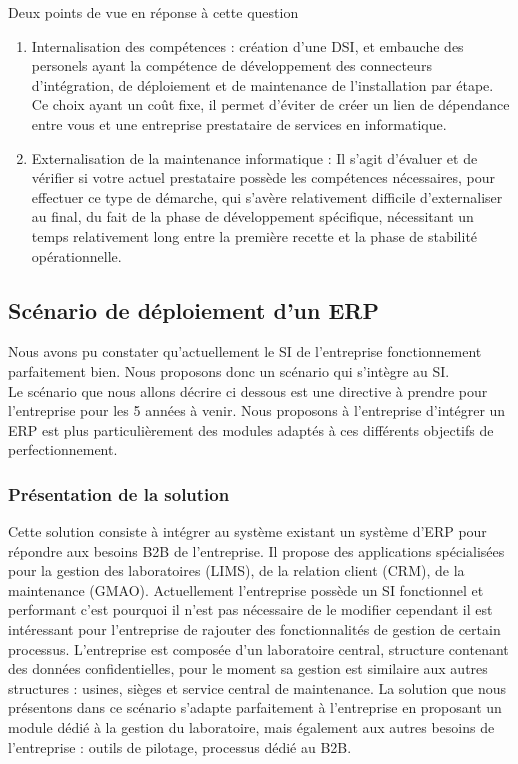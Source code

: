 Deux points de vue en réponse à cette question\\
\begin{enumerate}
\item Internalisation des compétences : création d'une DSI, et embauche des personels ayant la compétence de développement des connecteurs d'intégration, de déploiement et de maintenance de l'installation par étape. Ce choix ayant un coût fixe, il permet d'éviter de créer un lien de dépendance entre vous et une entreprise prestataire de services en informatique.
\item Externalisation de la maintenance informatique : Il s'agit d'évaluer et de vérifier si votre actuel prestataire possède les compétences nécessaires, pour effectuer ce type de démarche, qui s'avère relativement difficile d'externaliser au final, du fait de la phase de développement spécifique, nécessitant un temps relativement long entre la première recette et la phase de stabilité opérationnelle.
\end{enumerate}

\subsection{Scénario de déploiement d'un ERP}
Nous avons pu constater qu'actuellement le SI de l'entreprise fonctionnement parfaitement bien. Nous proposons donc un scénario qui s'intègre au SI. \\
Le scénario que nous allons décrire ci dessous est une directive à prendre pour l'entreprise pour les 5 années à venir. Nous proposons à l'entreprise d'intégrer un ERP est plus particulièrement des modules adaptés à ces différents objectifs de perfectionnement.  
\subsubsection{Présentation de la solution}
Cette solution consiste à intégrer au système existant un système d'ERP pour répondre aux besoins B2B de l'entreprise. Il propose des applications spécialisées pour la gestion des laboratoires (LIMS), de la relation client (CRM), de la maintenance (GMAO). Actuellement l'entreprise possède un SI fonctionnel et performant c'est pourquoi il n'est pas nécessaire de le modifier cependant il est intéressant pour l'entreprise de rajouter des fonctionnalités de gestion de certain processus. L'entreprise est composée d'un laboratoire central, structure contenant des données confidentielles, pour le moment sa gestion est similaire aux autres structures : usines, sièges et service central de maintenance. La solution que nous présentons dans ce scénario s'adapte parfaitement à l'entreprise en proposant un module dédié à la gestion du laboratoire, mais également aux autres besoins de l'entreprise : outils de pilotage, processus dédié au B2B.   
